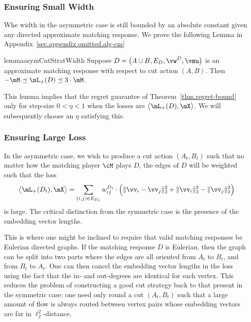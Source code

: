 \documentclass[letterpaper]{article}
\begin{document}
\subsubsection{Ensuring Small Width}

Whe width in the asymmetric case is still bounded by an absolute constant given any directed approximate matching response. We prove the following Lemma in Appendix~\ref{sec.appendix.omitted.alg-cm}

\begin{restatable}{lemma}{asymCutStratWidth}
\label{lem.asym-cut-strat.width}
Suppose $D = \big( A \cup B, E_D, \vw^D, \vmu \big)$ is an approximate matching response with respect to cut action $(A, B)$. Then $- \mM \preceq \mL_{+}(D) \preceq 3 \cdot \mM$.
\end{restatable}

\noindent
This lemma implies that the regret guarantee of Theorem~\ref{thm.regret-bound} only for step-size $0 < \eta < 1$ when the losses are $\big\langle \mL_{+}(D), \mX \big\rangle$. We will subsequently choose an $\eta$ satisfying this.


\subsubsection{Ensuring Large Loss}

In the asymmetric case, we wish to produce a cut action $(A_t, B_t)$ such that no matter how the matching player $\cM$ plays $D$, the edges of $D$ will be weighted such that the loss
\begin{equation*}
\big\langle \mL_{+}(D_t), \mX \big\rangle
= \sum_{(i, j) \in E_{D_t}} w^{D_t}_{ij} \cdot \Big( \lVert \vv_{i} - \vv_{j} \rVert_2^2 + \lVert \vv_{i} \rVert_2^2 - \lVert \vv_{j} \rVert_2^2 \Big)
\end{equation*}
is large. The critical distinction from the symmetric case is the presence of the embedding vector lengths.

This is where one might be inclined to require that valid matching responses be Eulerian directed graphs. If the matching response $D$ is Eulerian, then the graph can be split into two parts where the edges are all oriented from $A_t$ to $B_t$, and from $B_t$ to $A_t$. One can then cancel the embedding vector lengths in the loss using the fact that the in- and out-degrees are identical for each vertex. This reduces the problem of constructing a good cut strategy back to that present in the symmetric case: one need only round a cut $(A_t, B_t)$ such that a large amount of flow is always routed between vertex pairs whose embedding vectors are far in $\ell_2^2$-distance.
\end{document}
